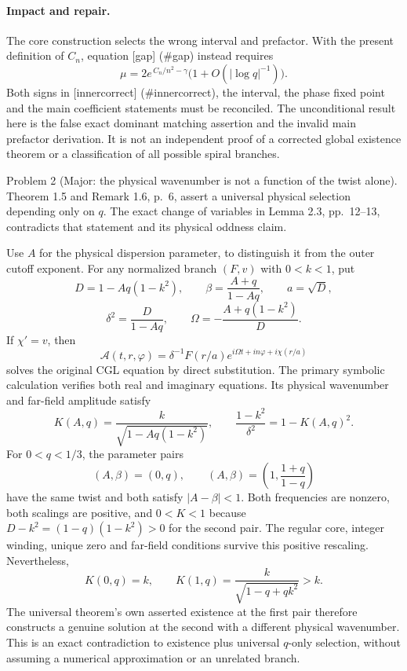 \documentclass[10pt]{article}
\begin{document}
\paragraph*{Impact and repair.}\mbox{}\par
The core construction selects the wrong interval and prefactor. With the present definition of \(C_n\), equation [gap] (\#gap) instead requires \[\mu=2e^{\,C_n/n^2-\gamma}
                \bigl(1+O(|\log q|^{-1})\bigr).\] Both signs in [innercorrect] (\#innercorrect), the interval, the phase fixed point and the main coefficient statements must be reconciled. The unconditional result here is the false exact dominant matching assertion and the invalid main prefactor derivation. It is not an independent proof of a corrected global existence theorem or a classification of all possible spiral branches.\par
Problem 2 (Major: the physical wavenumber is not a function of the twist alone).  Theorem 1.5 and Remark 1.6, p. 6, assert a universal physical selection depending only on \(q\). The exact change of variables in Lemma 2.3, pp. 12–13, contradicts that statement and its physical oddness claim.\par
Use \(A\) for the physical dispersion parameter, to distinguish it from the outer cutoff exponent. For any normalized branch \((F,v)\) with \(0<k<1\), put \[D=1-Aq(1-k^2),\qquad
 \beta=\frac{A+q}{1-Aq},\qquad a=\sqrt D,\] \[\delta^2=\frac D{1-Aq},\qquad
 \Omega=-\frac{A+q(1-k^2)}D.\] If \(\chi'=v\), then \[\mathcal{A}(t,r,\varphi)=
 \delta^{-1}F(r/a)
       e^{i\Omega t+in\varphi+i\chi(r/a)}\] solves the original CGL equation by direct substitution. The primary symbolic calculation verifies both real and imaginary equations. Its physical wavenumber and far-field amplitude satisfy \[K(A,q)=\frac{k}{\sqrt{1-Aq(1-k^2)}},\qquad
 \frac{1-k^2}{\delta^2}=1-K(A,q)^2.\] For \(0<q<1/3\), the parameter pairs \[(A,\beta)=(0,q),\qquad
 (A,\beta)=\left(1,\frac{1+q}{1-q}\right)\] have the same twist and both satisfy \(|A-\beta|<1\). Both frequencies are nonzero, both scalings are positive, and \(0<K<1\) because \(D-k^2=(1-q)(1-k^2)>0\) for the second pair. The regular core, integer winding, unique zero and far-field conditions survive this positive rescaling. Nevertheless, \[K(0,q)=k,\qquad
 K(1,q)=\frac{k}{\sqrt{1-q+qk^2}}>k.\] The universal theorem’s own asserted existence at the first pair therefore constructs a genuine solution at the second with a different physical wavenumber. This is an exact contradiction to existence plus universal \(q\)-only selection, without assuming a numerical approximation or an unrelated branch.\par
\end{document}

